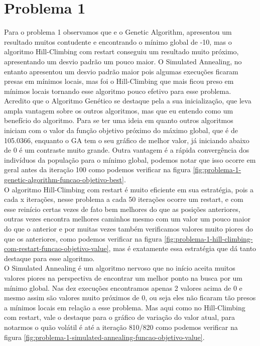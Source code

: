 \section[Problema 1]{Problema 1}

Para o problema 1 observamos que e o Genetic Algorithm, apresentou um resultado muitos contudente e encontrando o mínimo global de -10, mas o algoritmo Hill-Climbing com restart conseguiu um resultado muito próximo, apresentando um desvio padrão um pouco maior. O Simulated Annealing, no entanto apresentou um desvio padrão maior pois algumas execuções ficaram presas em mínimos locais, mas foi o Hill-Climbing que mais ficou preso em mínimos locais tornando esse algoritmo pouco efetivo para esse problema. \\

Acredito que o Algoritmo Genético se destaque pela a sua inicialização, que leva ampla vantagem sobre os outros algoritmos, mas que eu entendo como um benefício do algoritmo. Para se ter uma ideia em quanto outros algoritmos iniciam com o valor da função objetivo próximo do máximo global, que é de 105.0366, enquanto o GA tem o seu gráfico de melhor valor, já iniciando abaixo de 0 é um contraste muito grande. Outra vantagem é a rápida convergência dos indivíduos da população para o mínimo global, podemos notar que isso ocorre em geral antes da iteração 100 como podemos verificar na figura \ref{fig:problema-1-genetic-algorithm-funcao-objetivo-best}. \\

O algoritmo Hill-Climbing com restart é muito eficiente em sua estratégia, pois a cada x iterações, nesse problema a cada 50 iterações ocorre um restart, e com esse reinício certas vezes de fato bem melhores do que as posições anteriores, outras vezes encontra melhores caminhos mesmo com um valor um pouco maior do que o anterior e por muitas vezes também verificamos valores muito piores do que os anteriores, como podemos verificar na figura \ref{fig:problema-1-hill-climbing-com-restart-funcao-objetivo-value}, mas é exatamente essa estratégia que dá tanto destaque para esse algoritmo. \\

O Simulated Annealing é um algoritmo nervoso que no início aceita muitos valores piores na perspectiva de encontrar um melhor ponto na busca por um mínimo global. Nas dez execuções encontramos apenas 2 valores acima de 0 e mesmo assim são valores muito próximos de 0, ou seja eles não ficaram tão presos a mínimos locais em relação a esse problema. Mas aqui como no Hill-Climbing com restart, vale o destaque para o gráfico de variação do valor atual, para notarmos o quão volátil é até a iteração 810/820 como podemos verificar na figura \ref{fig:problema-1-simulated-annealing-funcao-objetivo-value}. \\

